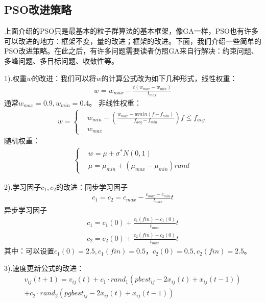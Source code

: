     \subsection{PSO改进策略}
        \par
        上面介绍的PSO只是最基本的粒子群算法的基本框架，像GA一样，PSO也有许多可以改进的地方：框架不变，量的改进；框架的改进。下面，我们介绍一些简单的PSO改进策略。在此之后，有许多问题需要读者仿照GA来自行解决：约束问题、多峰问题、多目标问题、收敛性等。
        \par
        1).权重$w$的改进：我们可以将$w$的计算公式改为如下几种形式，线性权重：
        \begin{align*}
        w = w_{max} - \frac{t(w_{max}-w_{min}) }{t_{max}}
        \end{align*}
        通常$w_{max} = 0.9,w_{min}=0.4$。
        非线性权重：
        \begin{align*}
        w = \left\{
        \begin{aligned}
        & w_{min} - \left( \frac{w_{max}-w{min}(f-f_{min})}{f_{avg}-f_{min}} \right) f \leqslant f_{avg}\\
        & w_{max}
        \end{aligned}
        \right.
        \end{align*}
        随机权重：
        \begin{align*}
        \left\{
        \begin{aligned}
        & w=\mu+\sigma^*N(0,1)\\
        & \mu=\mu_{min}+(\mu_{max}-\mu_{min})rand
        \end{aligned}
        \right.
        \end{align*}
        \par
        2).学习因子$c_1,c_2$的改进：同步学习因子
        \begin{align*}
        c_1 = c_2 = c_{max} - \frac{c_{max}-c_{min}}{t_{max}}t
        \end{align*}
        异步学习因子
        \begin{align*}
        c_1 = c_1(0)+\frac{c_1(fin)-c_1(0)}{t_{max}}t\\
        c_2 = c_2(0)+\frac{c_2(fin)-c_2(0)}{t_{max}}t
        \end{align*}
        其中：可以设置$c_1(0) = 2.5,c_1(fin)=0.5$，$c_2(0)=0.5,c_2(fin)=2.5$。
        \par
        3).速度更新公式的改进：
        \begin{align*}
        v_{ij}(t+1)=v_{ij}(t)+c_1\cdot rand_1(pbest_{ij}-2x_{ij}(t)+x_{ij}(t-1))\\
        +c_2\cdot rand_2(pgbest_{ij}-2x_{ij}(t)+x_{ij}(t-1))
        \end{align*}
